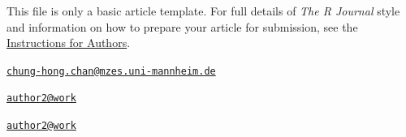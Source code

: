 This file is only a basic article template. For full details of
\emph{The R Journal} style and information on how to prepare your
article for submission, see the
\href{https://journal.r-project.org/share/author-guide.pdf}{Instructions
for Authors}.




\address{%
Chung-hong Chan\\
Mannheimer Zentrum für Europäische Sozialforschung\\
line 1\\ line 2\\
}
\href{mailto:chung-hong.chan@mzes.uni-mannheim.de}{\nolinkurl{chung-hong.chan@mzes.uni-mannheim.de}}

\address{%
Chia-Yi Yen\\
Graduate School of Economic and Social Sciences, Universität Mannheim,
Germany\\
line 1\\ line 2\\
}
\href{mailto:author2@work}{\nolinkurl{author2@work}}

\address{%
Mia Huai-Wen Chang\\
Akelius Residential Property AB, Berlin, Germany\\
line 1\\ line 2\\
}
\href{mailto:author2@work}{\nolinkurl{author2@work}}

